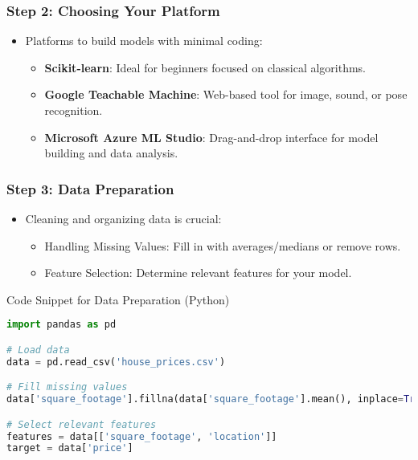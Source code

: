 \documentclass[aspectratio=169]{beamer}
\begin{document}
\begin{frame}[fragile]
    \frametitle{Step 2: Choosing Your Platform}
    \begin{itemize}
        \item Platforms to build models with minimal coding:
            \begin{itemize}
                \item \textbf{Scikit-learn}: Ideal for beginners focused on classical algorithms.
                \item \textbf{Google Teachable Machine}: Web-based tool for image, sound, or pose recognition.
                \item \textbf{Microsoft Azure ML Studio}: Drag-and-drop interface for model building and data analysis.
            \end{itemize}
    \end{itemize}
\end{frame}

\begin{frame}[fragile]
    \frametitle{Step 3: Data Preparation}
    \begin{itemize}
        \item Cleaning and organizing data is crucial:
            \begin{itemize}
                \item Handling Missing Values: Fill in with averages/medians or remove rows.
                \item Feature Selection: Determine relevant features for your model.
            \end{itemize}
    \end{itemize}
    \begin{block}{Code Snippet for Data Preparation (Python)}
    \begin{lstlisting}[language=Python]
import pandas as pd

# Load data
data = pd.read_csv('house_prices.csv')

# Fill missing values
data['square_footage'].fillna(data['square_footage'].mean(), inplace=True)

# Select relevant features
features = data[['square_footage', 'location']]
target = data['price']
    \end{lstlisting}
    \end{block}
\end{frame}
\end{document}
